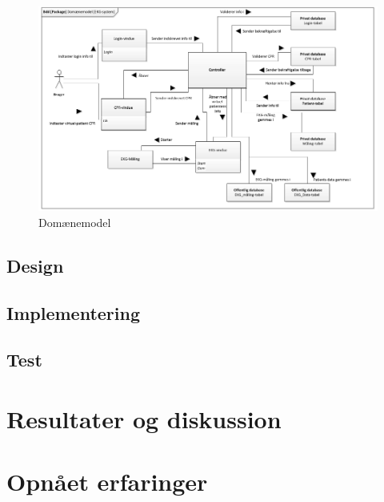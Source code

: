 \begin{figure}[H]
	\centering
	\includegraphics[width=1\textwidth]{Figurer/Snip20150525_18}
	\caption{Domænemodel}
\end{figure}


\subsection{Design}

\subsection{Implementering}

\subsection{Test}

\section{Resultater og diskussion}

\section{Opnået erfaringer}

